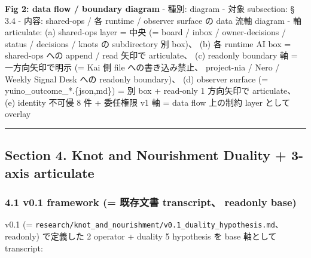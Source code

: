 \documentclass[
]{article}
\begin{document}
\textbf{Fig 2: data flow / boundary diagram} - 種別: diagram - 対象
subsection: § 3.4 - 内容: shared-ops / 各 runtime / observer surface の
data 流軸 diagram - 軸 articulate: (a) shared-ops layer = 中央 (= board
/ inbox / owner-decisions / status / decisions / knots の subdirectory
別 box)、 (b) 各 runtime AI box = shared-ops への append / read 矢印で
articulate、 (c) readonly boundary 軸 = 一方向矢印で明示 (= Kai 側 file
への書き込み禁止、 project-nia / Nero / Weekly Signal Desk への readonly
boundary)、 (d) observer surface (= yuino\_outcome\_*.\{json,md\}) = 別
box + read-only 1 方向矢印で articulate、 (e) identity 不可侵 8 件 +
委任権限 v1 軸 = data flow 上の制約 layer として overlay

\begin{center}\rule{0.5\linewidth}{0.5pt}\end{center}

\subsection{Section 4. Knot and Nourishment Duality + 3-axis
articulate}\label{section-4.-knot-and-nourishment-duality-3-axis-articulate}

\subsubsection{4.1 v0.1 framework (= 既存文書 transcript、 readonly
base)}\label{v0.1-framework-ux65e2ux5b58ux6587ux66f8-transcript-readonly-base}

v0.1 (=
\texttt{research/knot\_and\_nourishment/v0.1\_duality\_hypothesis.md}、
readonly) で定義した 2 operator + duality 5 hypothesis を base 軸として
transcript:
\end{document}

